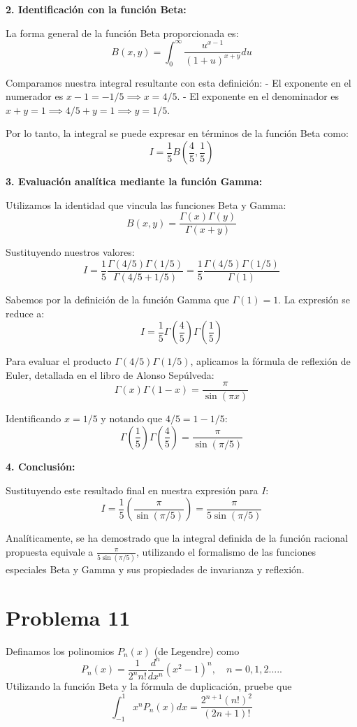 \documentclass[a4paper]{article}
\begin{document}
\textbf{2. Identificación con la función Beta:}

La forma general de la función Beta proporcionada es:
$$ B(x, y) = \int_{0}^{\infty} \frac{u^{x-1}}{(1+u)^{x+y}} du $$

Comparamos nuestra integral resultante con esta definición:
- El exponente en el numerador es $x - 1 = -1/5 \implies x = 4/5$.
- El exponente en el denominador es $x + y = 1 \implies 4/5 + y = 1 \implies y = 1/5$.

Por lo tanto, la integral se puede expresar en términos de la función Beta como:
$$ I = \frac{1}{5} B\left(\frac{4}{5}, \frac{1}{5}\right) $$

\textbf{3. Evaluación analítica mediante la función Gamma:}

Utilizamos la identidad que vincula las funciones Beta y Gamma:
$$ B(x, y) = \frac{\Gamma(x)\Gamma(y)}{\Gamma(x+y)} $$

Sustituyendo nuestros valores:
$$ I = \frac{1}{5} \frac{\Gamma(4/5)\Gamma(1/5)}{\Gamma(4/5 + 1/5)} = \frac{1}{5} \frac{\Gamma(4/5)\Gamma(1/5)}{\Gamma(1)} $$

Sabemos por la definición de la función Gamma que $\Gamma(1) = 1$. La expresión se reduce a:
$$ I = \frac{1}{5} \Gamma\left(\frac{4}{5}\right)\Gamma\left(\frac{1}{5}\right) $$

Para evaluar el producto $\Gamma(4/5)\Gamma(1/5)$, aplicamos la fórmula de reflexión de Euler, detallada en el libro de Alonso Sepúlveda:
$$ \Gamma(x)\Gamma(1-x) = \frac{\pi}{\sin(\pi x)} $$

Identificando $x = 1/5$ y notando que $4/5 = 1 - 1/5$:
$$ \Gamma\left(\frac{1}{5}\right)\Gamma\left(\frac{4}{5}\right) = \frac{\pi}{\sin(\pi/5)} $$

\textbf{4. Conclusión:}

Sustituyendo este resultado final en nuestra expresión para $I$:
$$ I = \frac{1}{5} \left( \frac{\pi}{\sin(\pi/5)} \right) = \frac{\pi}{5 \sin(\pi/5)} $$

Analíticamente, se ha demostrado que la integral definida de la función racional propuesta equivale a $\frac{\pi}{5 \sin(\pi/5)}$, utilizando el formalismo de las funciones especiales Beta y Gamma y sus propiedades de invarianza y reflexión.


\section{Problema 11}
Definamos los polinomios $P_n(x)$ (de Legendre) como
$$ P_n(x) = \frac{1}{2^n n!} \frac{d^n}{dx^n} (x^2 - 1)^n , \quad n = 0, 1, 2..... $$
Utilizando la función Beta y la fórmula de duplicación, pruebe que
$$ \int_{-1}^1 x^n P_n(x) dx = \frac{2^{n+1}(n!)^2}{(2n+1)!} $$
\end{document}
